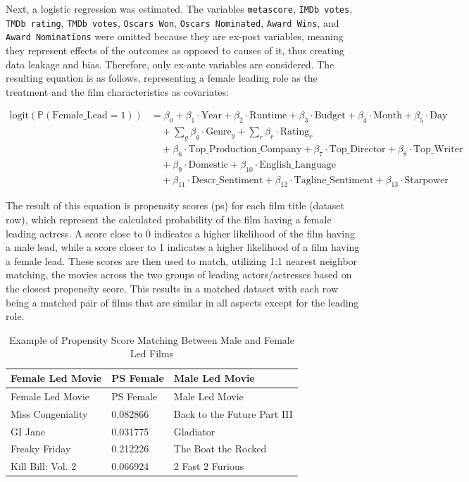 \documentclass[
]{agujournal2019}
\begin{document}
Next, a logistic regression was estimated. The variables
\texttt{metascore}, \texttt{IMDb\ votes}, \texttt{TMDb\ rating},
\texttt{TMDb\ votes}, \texttt{Oscars\ Won}, \texttt{Oscars\ Nominated},
\texttt{Award\ Wins}, and \texttt{Award\ Nominations} were omitted
because they are ex-post variables, meaning they represent effects of
the outcomes as opposed to causes of it, thus creating data leakage and
bias. Therefore, only ex-ante variables are considered. The resulting
equation is as follows, representing a female leading role as the
treatment and the film characteristics as covariates:

\begin{align}
\text{logit}(\mathbb{P}(\text{Female\_Lead} = 1)) &= \beta_0 
+ \beta_1 \cdot \text{Year}
+ \beta_2 \cdot \text{Runtime}
+ \beta_3 \cdot \text{Budget}
+ \beta_4 \cdot \text{Month}
+ \beta_5 \cdot \text{Day} \nonumber \\
&\quad + \sum_{g} \beta_g \cdot \text{Genre}_g
+ \sum_{r} \beta_r \cdot \text{Rating}_r \nonumber \\
&\quad + \beta_6 \cdot \text{Top\_Production\_Company}
+ \beta_7 \cdot \text{Top\_Director}
+ \beta_8 \cdot \text{Top\_Writer} \nonumber \\
&\quad + \beta_9 \cdot \text{Domestic}
+ \beta_{10} \cdot \text{English\_Language} \nonumber \\
&\quad + \beta_{11} \cdot \text{Descr\_Sentiment}
+ \beta_{12} \cdot \text{Tagline\_Sentiment}
+ \beta_{13} \cdot \text{Starpower}
\end{align}

The result of this equation is propensity scores (ps) for each film
title (dataset row), which represent the calculated probability of the
film having a female leading actress. A score close to 0 indicates a
higher likelihood of the film having a male lead, while a score closer
to 1 indicates a higher likelihood of a film having a female lead. These
scores are then used to match, utilizing 1:1 nearest neighbor matching,
the movies across the two groups of leading actors/actresses based on
the closest propensity score. This results in a matched dataset with
each row being a matched pair of films that are similar in all aspects
except for the leading role.

\begin{longtable}[]{@{}lll@{}}
\caption{Example of Propensity Score Matching Between Male and Female
Led Films}\label{tbl-9}\tabularnewline
\toprule\noalign{}
Female Led Movie & PS Female & Male Led Movie \\
\midrule\noalign{}
\endfirsthead
\toprule\noalign{}
Female Led Movie & PS Female & Male Led Movie \\
\midrule\noalign{}
\endhead
\bottomrule\noalign{}
\endlastfoot
Miss Congeniality & 0.082866 & Back to the Future Part III \\
GI Jane & 0.031775 & Gladiator \\
Freaky Friday & 0.212226 & The Boat the Rocked \\
Kill Bill: Vol. 2 & 0.066924 & 2 Fast 2 Furious \\
\end{longtable}
\end{document}
